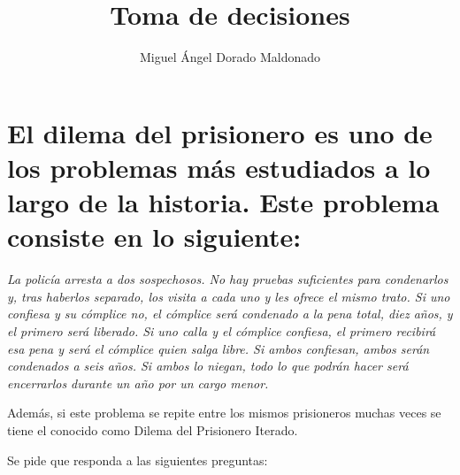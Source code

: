 \documentclass{llncs}
\begin{document}
\title{Toma de decisiones}

\author{Miguel Ángel Dorado Maldonado}

\maketitle

\vspace{1cm}

\section{El dilema del prisionero es uno de los problemas más estudiados a lo largo de la historia. Este problema consiste en lo siguiente:}

\textit{La policía arresta a dos sospechosos. No hay pruebas suficientes para condenarlos y, tras haberlos separado, los visita a cada uno y les ofrece el mismo trato. Si uno confiesa y su cómplice no, el cómplice será condenado a la pena total, diez años, y el primero será liberado. Si uno calla y el cómplice confiesa, el primero recibirá esa pena y será el cómplice quien salga libre. Si ambos confiesan, ambos serán condenados a seis años. Si ambos lo niegan, todo lo que podrán hacer será encerrarlos durante un año por un cargo menor.}

\vspace{0.25cm}
Además, si este problema se repite entre los mismos prisioneros muchas veces se tiene el conocido como Dilema del Prisionero Iterado.

\vspace{0.25cm}
Se pide que responda a las siguientes preguntas:
\end{document}
